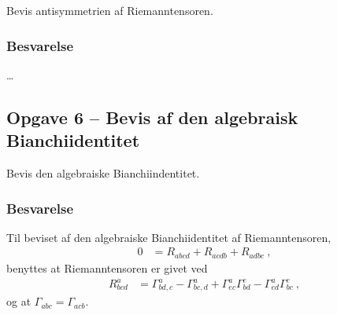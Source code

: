 \documentclass[../main.tex]{subfiles}
\begin{document}
Bevis antisymmetrien af Riemanntensoren.


\subsubsection{Besvarelse}

\ldots




\subsection{Opgave 6 -- Bevis af den algebraisk Bianchiidentitet}
\setcounter{subsection}{6}
\setcounter{equation}{0}

Bevis den algebraiske Bianchiindentitet.


\subsubsection{Besvarelse}

Til beviset af den algebraiske Bianchiidentitet af Riemanntensoren,
\begin{align}
    0 &= R_{abcd} + R_{acdb} + R_{adbc} \: ,
\end{align}
benyttes at Riemanntensoren er givet ved
\begin{align}
    R^a_{bcd} &= \Gamma^a_{bd,c} - \Gamma^a_{bc,d} + \Gamma^a_{ec} \Gamma^e_{bd} - \Gamma^a_{ed} \Gamma^e_{bc} \: ,
\end{align}
og at $\Gamma_{abc} = \Gamma_{acb}$.
\end{document}
